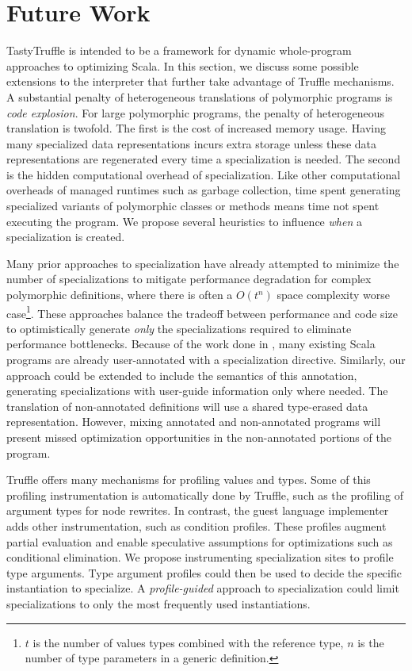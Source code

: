 \chapter{Future Work}

TastyTruffle is intended to be a framework for dynamic whole-program approaches to optimizing Scala.
In this section, we discuss some possible extensions to the interpreter that further take advantage of Truffle mechanisms.
A substantial penalty of heterogeneous translations of polymorphic programs is \textit{code explosion}.
For large polymorphic programs, the penalty of heterogeneous translation is twofold.
The first is the cost of increased memory usage.
Having many specialized data representations incurs extra storage unless these data representations are regenerated every time a specialization is needed.
The second is the hidden computational overhead of specialization. 
Like other computational overheads of managed runtimes such as garbage collection, time spent generating specialized variants of polymorphic classes or methods means time not spent executing the program.
We propose several heuristics to influence \textit{when} a specialization is created.

Many prior approaches to specialization have already attempted to minimize the number of specializations to mitigate performance degradation for complex polymorphic definitions, where there is often a \(O(t^n)\) space complexity worse case\footnote{$t$ is the number of values types combined with the reference type, $n$ is the number of type parameters in a generic definition.}.
These approaches balance the tradeoff between performance and code size to optimistically generate \textit{only} the specializations required to eliminate performance bottlenecks.
Because of the work done in \cite{scala:specialization}, many existing Scala programs are already user-annotated with a specialization directive.
Similarly, our approach could be extended to include the semantics of this annotation, generating specializations with user-guide information only where needed.
The translation of non-annotated definitions will use a shared type-erased data representation.
However, mixing annotated and non-annotated programs will present missed optimization opportunities in the non-annotated portions of the program.

Truffle offers many mechanisms for profiling values and types.
Some of this profiling instrumentation is automatically done by Truffle, such as the profiling of argument types for node rewrites. In contrast, the guest language implementer adds other instrumentation,  such as condition profiles.
These profiles augment partial evaluation and enable speculative assumptions for optimizations such as conditional elimination.
We propose instrumenting specialization sites to profile type arguments.
Type argument profiles could then be used to decide the specific instantiation to specialize.
A \textit{profile-guided} approach to specialization could limit specializations to only the most frequently used instantiations.

